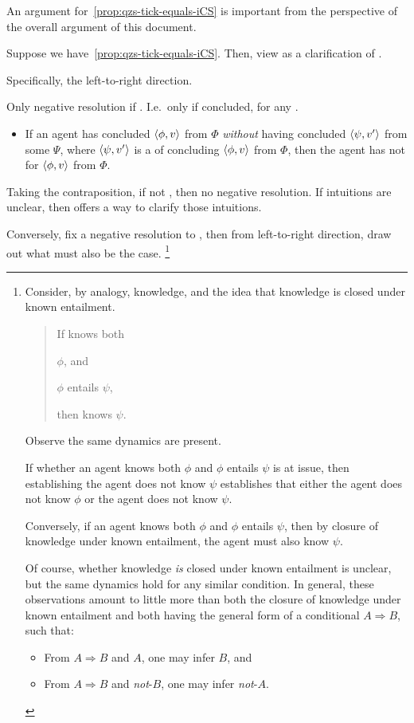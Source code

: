 \begin{note}[Contraposition]
  An argument for~\autoref{prop:qzs-tick-equals-iCS} is important from the perspective of the overall argument of this document.

  Suppose we have~\autoref{prop:qzs-tick-equals-iCS}.
  Then, view \izetaS{} as a clarification of \qzS{}.

  Specifically, the left-to-right direction.

  Only negative resolution if \izetaS{}.
  I.e.\ only if concluded, for any \requ{}.

  \begin{itemize}
  \item
    If an agent has concluded \(\langle \phi, v \rangle\) from \(\Phi\) \emph{without} having concluded \(\langle \psi, v' \rangle\) from some \(\Psi\), where \(\langle \psi, v' \rangle\) is a \requ{} of concluding \(\langle \phi, v \rangle\) from \(\Phi\), then the agent has not \csVed{} for \(\langle \phi, v \rangle\) from \(\Phi\).
  \end{itemize}

  Taking the contraposition, if not \izetaS{}, then no negative resolution.
  If intuitions are unclear, then \izetaS{} offers a way to clarify those intuitions.

  Conversely, fix a negative resolution to \qzS{}, then from left-to-right direction, draw out what must also be the case.%
  \footnote{
    Consider, by analogy, knowledge, and the idea that knowledge is closed under known entailment.
    \begin{quote}
      If \vAgent{} knows both
      \begin{enumerate*}[label=(\roman*)]
      \item \(\phi\), and
      \item \(\phi\) entails \(\psi\),
      \end{enumerate*}
      then \vAgent{} knows \(\psi\).
    \end{quote}
    Observe the same dynamics are present.

    If whether an agent knows both \(\phi\) and \(\phi\) entails \(\psi\) is at issue, then establishing the agent does not know \(\psi\) establishes that either the agent does not know \(\phi\) or the agent does not know \(\psi\).

    Conversely, if an agent knows both \(\phi\) and \(\phi\) entails \(\psi\), then by closure of knowledge under known entailment, the agent must also know \(\psi\).

    Of course, whether knowledge \emph{is} closed under known entailment is unclear, but the same dynamics hold for any similar condition.
    In general, these observations amount to little more than both the closure of knowledge under known entailment and \izetaS{} both having the general form of a conditional \(A \Rightarrow B\), such that:
    \begin{itemize}
    \item
      From \(A \Rightarrow B\) and \(A\), one may infer \(B\), and
    \item
      From \(A \Rightarrow B\) and \emph{not}-\(B\), one may infer \emph{not}-\(A\).
    \end{itemize}
  }


\end{note}

